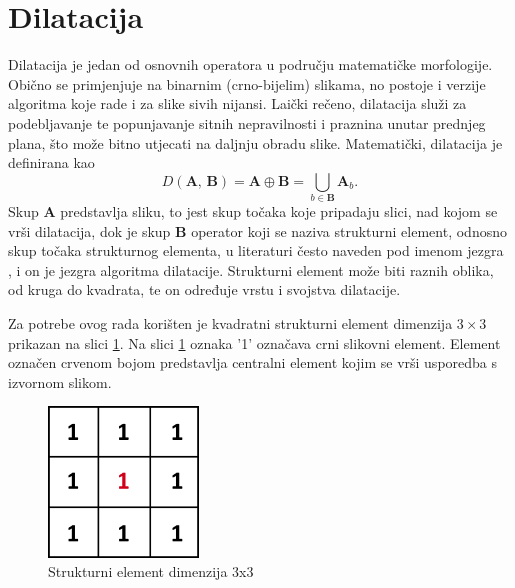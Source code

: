 \section{Dilatacija}
Dilatacija je jedan od osnovnih operatora u području matematičke morfologije. Obično se primjenjuje na binarnim (crno-bijelim) slikama, no postoje i verzije algoritma koje rade i za slike sivih nijansi. Laički rečeno, dilatacija služi za podebljavanje te popunjavanje sitnih nepravilnosti i praznina unutar prednjeg plana, što može bitno utjecati na daljnju obradu slike. Matematički, dilatacija je definirana kao
\begin{equation} \label{eq:dilation}
    D(\textbf{A, B}) = \textbf{A} \oplus \textbf{B} = \bigcup_{b \in \textbf{B}} \textbf{A}_b.
\end{equation}
Skup \textbf{A} predstavlja sliku, to jest skup točaka koje pripadaju slici, nad kojom se vrši dilatacija, dok je skup \textbf{B} operator koji se naziva strukturni element, odnosno skup točaka strukturnog elementa, u literaturi često naveden pod imenom jezgra , i on je jezgra algoritma dilatacije. Strukturni element može biti raznih oblika, od kruga do kvadrata, te on određuje vrstu i svojstva dilatacije.

Za potrebe ovog rada korišten je kvadratni strukturni element dimenzija $3 \times 3$ prikazan na slici \ref{fig:kernel}. Na slici \ref{fig:kernel} oznaka '1' označava crni slikovni element. Element označen crvenom bojom predstavlja centralni element kojim se vrši usporedba s izvornom slikom.
\begin{figure}[htb]
    \centering
    \includegraphics[width=4cm]{images/3x3kernel.jpg}
    \caption{Strukturni element dimenzija 3x3}
    \label{fig:kernel}
\end{figure}

